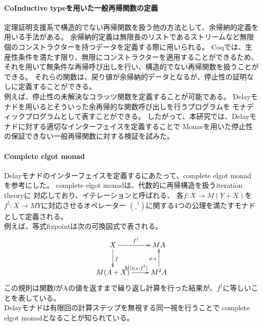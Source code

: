 \documentclass[japanese]{jssst_ppl}
\theoremstyle{definition}
\begin{document}
\paragraph{CoInductive typeを用いた一般再帰関数の定義}
定理証明支援系で構造的でない再帰関数を扱う他の方法として、余帰納的定義を用いる手法がある。
余帰納的定義は無限長のリストであるストリームなど無限個のコンストラクターを持つデータを定義する際に用いられる。
Coqでは、生産性条件を満たす限り、無限にコンストラクターを適用することができるため、
それを用いて無条件な再帰呼び出しを行い、構造的でない再帰関数を扱うことができる。
それらの関数は、戻り値が余帰納的データとなるが、停止性の証明なしに定義することができる。\\
例えば、停止性の未解決なコラッツ関数を定義することが可能である。
Delayモナド\cite{lmcs:2265}を用いるとそういった余再帰的な関数呼び出しを行うプログラムを
モナディックプログラムとして表すことができる。
したがって、本研究では、Delayモナドに対する適切なインターフェイスを定義することで
Monaeを用いた停止性の保証できない一般再帰関数に対する検証を試みた。
\paragraph{Complete elgot monad}
Delayモナドのインターフェイスを定義するにあたって、complete elgot monad\cite{ADAMEK20101306}
を参考にした。
complete elgot monadは、代数的に再帰構造を扱うiteration theory\cite{1993Bloom}に
対応しており、イテレーションと呼ばれる、
各$f : X \rightarrow M (Y + X)$を$f^{\dagger} : X \rightarrow M Y$に対応させるオペレーター
$(\_^{\dagger})$に関する4つの公理を満たすモナドとして定義される。\\
例えば、等式fixpointは次の可換図式で表される。
\xymatrixcolsep{2.5cm}
\[
  \xymatrix{
  X \ar[r]^{f^{\dagger}} \ar[d]^{f} & M A  \\
  M (A + X) \ar[r]^{M[\eta_A, f^{\dagger}]}  & M^2 A \ar[u]^{\mu_A}
  }
\]
この規則は関数fがAの値を返すまで繰り返し計算を行った結果が、$f^{\dagger}$に等しいことを表している。\\
Delayモナドは有限回の計算ステップを無視する同一視を行うことで
complete elgot monadとなることが知られている\cite{10.1007/978-3-319-67729-3_3}。
\end{document}
